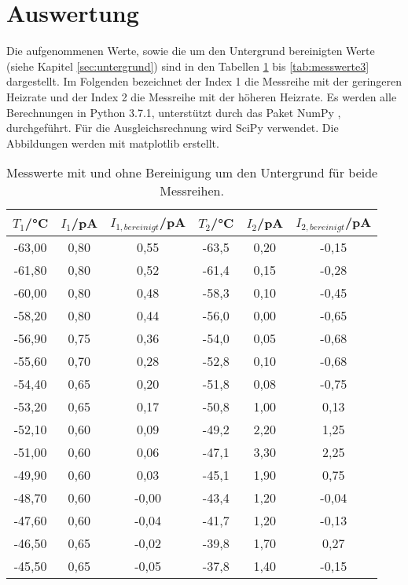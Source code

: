 \section{Auswertung}
\label{sec:Auswertung}

Die aufgenommenen Werte, sowie die um den Untergrund bereinigten Werte (siehe
Kapitel \ref{sec:untergrund}) sind in den Tabellen \ref{tab:messwerte1}
bis \ref{tab:messwerte3} dargestellt. Im Folgenden bezeichnet der Index 1 die
Messreihe mit der geringeren Heizrate und der Index 2 die Messreihe mit der
höheren Heizrate. Es werden alle Berechnungen in Python 3.7.1, unterstützt durch das
Paket NumPy \cite{numpy}, durchgeführt. Für die Ausgleichsrechnung wird SciPy
\cite{scipy} verwendet. Die Abbildungen werden mit matplotlib \cite{matplotlib} erstellt.

\begin{table}[htp]
	\begin{center}
    \caption{Messwerte mit und ohne Bereinigung um den Untergrund für beide Messreihen.}
    \label{tab:messwerte1}
		\begin{tabular}{cccccc}
		\toprule
			{$T_1$/°C} & {$I_1$/pA} & {$I_{1,bereinigt}$/pA} & {$T_2$/°C} & {$I_2$/pA} & {$I_{2,bereinigt}$/pA}\\
			\midrule
			-63,00 & 0,80 & 0,55  & -63,5 & 0,20 & -0,15\\
			-61,80 & 0,80 & 0,52  & -61,4 & 0,15 & -0,28\\
			-60,00 & 0,80 & 0,48  & -58,3 & 0,10 & -0,45\\
			-58,20 & 0,80 & 0,44  & -56,0 & 0,00 & -0,65\\
			-56,90 & 0,75 & 0,36  & -54,0 & 0,05 & -0,68\\
			-55,60 & 0,70 & 0,28  & -52,8 & 0,10 & -0,68\\
			-54,40 & 0,65 & 0,20  & -51,8 & 0,08 & -0,75\\
			-53,20 & 0,65 & 0,17  & -50,8 & 1,00 & 0,13\\
			-52,10 & 0,60 & 0,09  & -49,2 & 2,20 & 1,25\\
			-51,00 & 0,60 & 0,06  & -47,1 & 3,30 & 2,25\\
			-49,90 & 0,60 & 0,03  & -45,1 & 1,90 & 0,75\\
			-48,70 & 0,60 & -0,00 & -43,4 & 1,20 & -0,04\\
			-47,60 & 0,60 & -0,04 & -41,7 & 1,20 & -0,13\\
			-46,50 & 0,65 & -0,02 & -39,8 & 1,70 & 0,27\\
			-45,50 & 0,65 & -0,05 & -37,8 & 1,40 & -0,15\\

\end{tabular}
\end{center}
\end{table}

